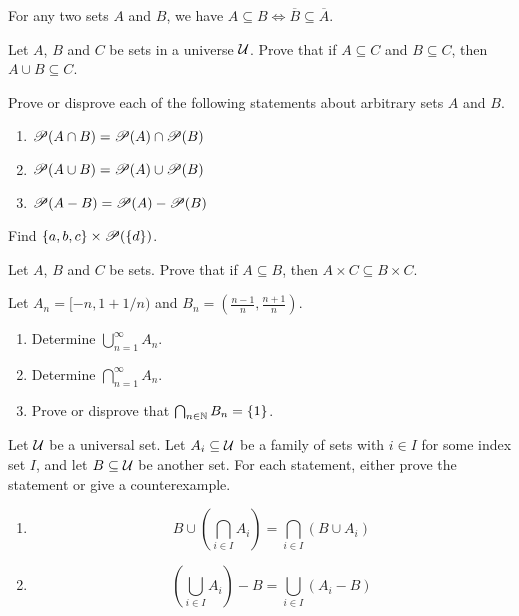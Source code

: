 \documentclass[12pt]{article}
\begin{document}
\begin{qu}
For any two sets $A$ and $B$, we have $A \subseteq B \iff \overline{B} \subseteq \overline{A}$.
\end{qu}

\begin{qu}
Let $A$, $B$ and $C$ be sets in a universe $\mathcal{U}$. Prove that if $A \subseteq C$ and $B \subseteq C$, then $A\cup B \subseteq C$.
\end{qu}

\begin{qu}
Prove or disprove each of the following statements about arbitrary sets $A$ and $B$. 
\begin{enumerate}[label=\alph*)]
\item $\mathscr{P}(A\cap B)=\mathscr{P}(A) \cap \mathscr{P}(B)$
\item $\mathscr{P}(A\cup B)=\mathscr{P}(A) \cup \mathscr{P}(B)$
\item $\mathscr{P}(A-B) = \mathscr{P}(A) - \mathscr{P}(B)$
\end{enumerate}
\end{qu}

\begin{qu}
Find $\left\{a, b, c\right\} \times \mathscr{P}(\left\{d\right\})$.
\end{qu}

\begin{qu}
Let $A$, $B$ and $C$ be sets. Prove that if $A \subseteq B$, then $A\times C \subseteq B \times C$.
\end{qu}

\begin{qu}
Let $A_n=[-n, 1+1/n)$ and $B_n=\left(\frac{n-1}{n}, \frac{n+1}{n}\right)$. 
\begin{enumerate}[label=\alph*)]
\item Determine $\bigcup_{n=1}^{\infty} A_n$.
\item Determine $\bigcap_{n=1}^{\infty} A_n$.
\item Prove or disprove that $\bigcap_{n \in \mathbb{N}} B_n =\left\{1\right\}$.
\end{enumerate}
\end{qu}



\begin{qu}
Let $\mathcal{U}$ be a universal set. Let $A_i \subseteq \mathcal{U}$ be a family of sets with $i \in I$ for some index set $I$, and let $B \subseteq \mathcal{U}$ be another set. For each statement, either prove the statement or give a counterexample.
\begin{enumerate}[label=\alph*)]
\item $$B \cup \left( \bigcap_{i \in I} A_i \right) =  \bigcap_{i \in I} \left(B \cup A_i \right)$$
\item $$ \left( \bigcup_{i \in I} A_i \right)-B =  \bigcup_{i \in I} \left(A_i -B \right)$$
\end{enumerate}
\end{qu}
\end{document}
